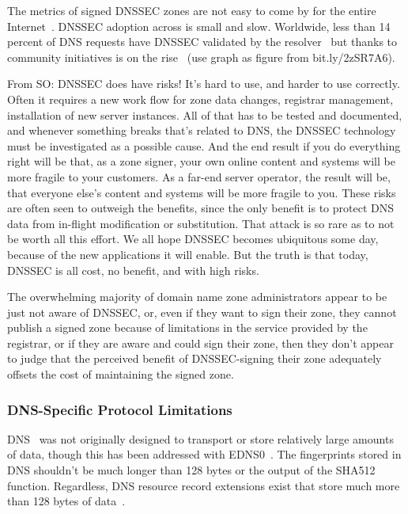 The metrics of signed DNSSEC zones are not easy to come by for the entire
Internet~\cite{APNIC}. DNSSEC adoption across is small and slow. Worldwide, less
than 14 percent of DNS requests have DNSSEC validated by the
resolver~\cite{APNIC} but thanks to community initiatives is on the
rise~\cite{Cloudflare} (use graph as figure from bit.ly/2zSR7A6).

From SO: DNSSEC does have risks! It's hard to use, and harder to use correctly.
Often it requires a new work flow for zone data changes, registrar management,
installation of new server instances. All of that has to be tested and
documented, and whenever something breaks that's related to DNS, the DNSSEC
technology must be investigated as a possible cause. And the end result if you
do everything right will be that, as a zone signer, your own online content and
systems will be more fragile to your customers. As a far-end server operator,
the result will be, that everyone else's content and systems will be more
fragile to you. These risks are often seen to outweigh the benefits, since the
only benefit is to protect DNS data from in-flight modification or substitution.
That attack is so rare as to not be worth all this effort. We all hope DNSSEC
becomes ubiquitous some day, because of the new applications it will enable. But
the truth is that today, DNSSEC is all cost, no benefit, and with high risks.

The overwhelming majority of domain name zone administrators appear to be just
not aware of DNSSEC, or, even if they want to sign their zone, they cannot
publish a signed zone because of limitations in the service provided by the
registrar, or if they are aware and could sign their zone, then they don’t
appear to judge that the perceived benefit of DNSSEC-signing their zone
adequately offsets the cost of maintaining the signed zone.

\subsubsection{DNS-Specific Protocol Limitations}

DNS~\cite{DNS1} was not originally designed to transport or store relatively
large amounts of data, though this has been addressed with EDNS0~\cite{EDNS}.
The fingerprints stored in DNS shouldn't be much longer than 128 bytes or the
output of the SHA512 function. Regardless, DNS resource record extensions exist
that store much more than 128 bytes of data~\cite{CERT, IPSECKEY, DANE3, DANE1}.

